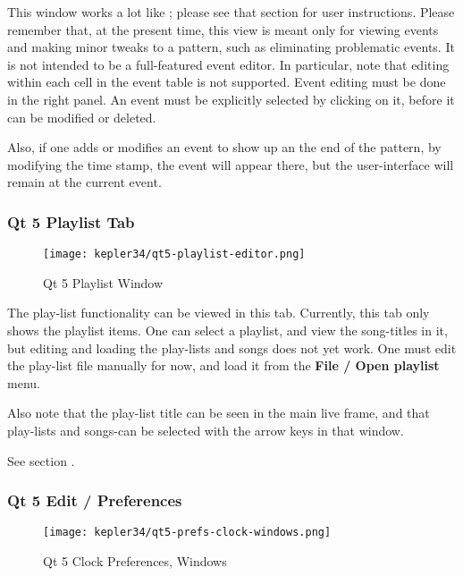    This window works a lot like ; please see
   that section for user instructions.  Please remember that, at the present
   time, this view is meant only for viewing events and making minor tweaks to
   a pattern, such as eliminating problematic events.  It is not intended to be
   a full-featured event editor.  In particular, note that editing within each
   cell in the event table is not supported.  Event editing must be done in the
   right panel.  An event must be explicitly selected by clicking on it, before
   it can be modified or deleted.

   Also, if one adds or modifies an event to show up an the end of the pattern,
   by modifying the time stamp, the event will appear there, but the
   user-interface will remain at the current event.

\subsubsection{Qt 5 Playlist Tab}
\label{subsubsec:qt_portmidi_qt5_playlist_tab}

\begin{figure}[H]
   \centering 
   \texttt{[image: kepler34/qt5-playlist-editor.png]}
   \caption{Qt 5 Playlist Window}
   \label{fig:qt5_playlist_window}
\end{figure}

   The play-list functionality can be viewed in this tab.
   Currently, this tab only shows the playlist items.  One can
   select a playlist, and view the song-titles in it, but
   editing and loading the play-lists and songs does not yet
   work.  One must edit the play-list file manually for now,
   and load it from the \textbf{File / Open playlist} menu.

   Also note that the play-list title can be seen in the main live frame, 
   and that play-lists and songs-can be selected with the arrow keys in that
   window.

   See section .

\subsubsection{Qt 5 Edit / Preferences}
\label{subsubsec:qt_portmidi_qt5_edit_prefs}

\begin{figure}[H]
   \centering 
   \texttt{[image: kepler34/qt5-prefs-clock-windows.png]}
   \caption{Qt 5 Clock Preferences, Windows}
   \label{fig:qt5_prefs_clock_windows}
\end{figure}

